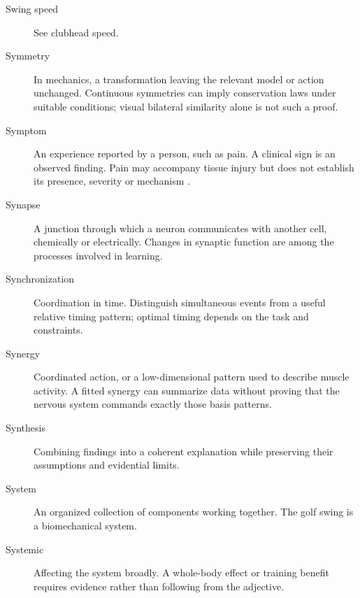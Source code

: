 \begin{description}
\item[Swing speed] See clubhead speed.

\item[Symmetry] In mechanics, a transformation leaving the relevant model or action unchanged. Continuous symmetries can imply conservation laws under suitable conditions; visual bilateral similarity alone is not such a proof.

\item[Symptom] An experience reported by a person, such as pain. A clinical sign is an observed finding. Pain may accompany tissue injury but does not establish its presence, severity or mechanism \citep{glossaryIASP}.

\item[Synapse] A junction through which a neuron communicates with another cell, chemically or electrically. Changes in synaptic function are among the processes involved in learning.

\item[Synchronization] Coordination in time. Distinguish simultaneous events from a useful relative timing pattern; optimal timing depends on the task and constraints.

\item[Synergy] Coordinated action, or a low-dimensional pattern used to describe muscle activity. A fitted synergy can summarize data without proving that the nervous system commands exactly those basis patterns.

\item[Synthesis] Combining findings into a coherent explanation while preserving their assumptions and evidential limits.

\item[System] An organized collection of components working together. The golf swing is a biomechanical system.

\item[Systemic] Affecting the system broadly. A whole-body effect or training benefit requires evidence rather than following from the adjective.

\end{description}
